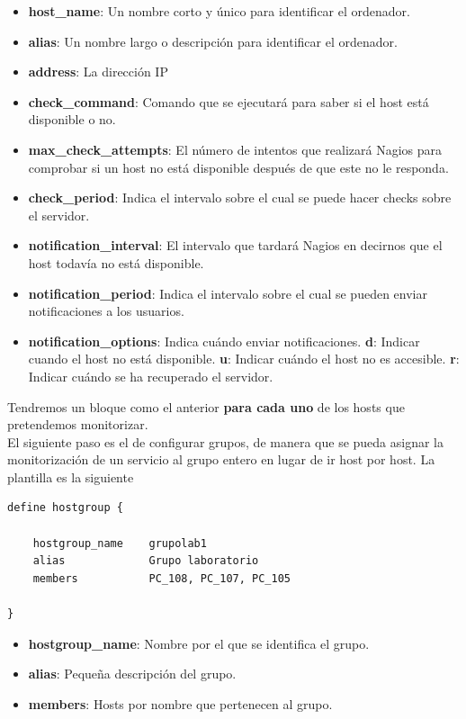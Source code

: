 \documentclass[11pt,a4paper]{article}
\begin{document}
\begin{itemize}
\item \textbf{host\_name}: Un nombre corto y único para identificar el ordenador.
\item \textbf{alias}: Un nombre largo o descripción para identificar el ordenador.
\item \textbf{address}: La dirección IP
\item \textbf{check\_command}: Comando que se ejecutará para saber si el host está disponible o no.
\item \textbf{max\_check\_attempts}: El número de intentos que realizará Nagios para comprobar si un host no está disponible después de que este no le responda.
\item \textbf{check\_period}: Indica el intervalo sobre el cual se puede hacer checks sobre el servidor.
\item \textbf{notification\_interval}: El intervalo que tardará Nagios en decirnos que el host todavía no está disponible.
\item \textbf{notification\_period}: Indica el intervalo sobre el cual se pueden enviar notificaciones a los usuarios.
\item \textbf{notification\_options}: Indica cuándo enviar notificaciones. \textbf{d}: Indicar cuando el host no está disponible. \textbf{u}: Indicar cuándo el host no es accesible. \textbf{r}: Indicar cuándo se ha recuperado el servidor.
\end{itemize}

Tendremos un bloque como el anterior \textbf{para cada uno} de los hosts que pretendemos monitorizar.
\\

El siguiente paso es el de configurar grupos, de manera que se pueda asignar la monitorización de un servicio al grupo entero en lugar de ir host por host. La plantilla es la siguiente

\begin{verbatim}
define hostgroup {

    hostgroup_name    grupolab1
    alias             Grupo laboratorio
    members           PC_108, PC_107, PC_105

}
\end{verbatim}

\begin{itemize}
\item \textbf{hostgroup\_name}: Nombre por el que se identifica el grupo.
\item \textbf{alias}: Pequeña descripción del grupo.
\item \textbf{members}: Hosts por nombre que pertenecen al grupo.
\end{itemize}
\end{document}
